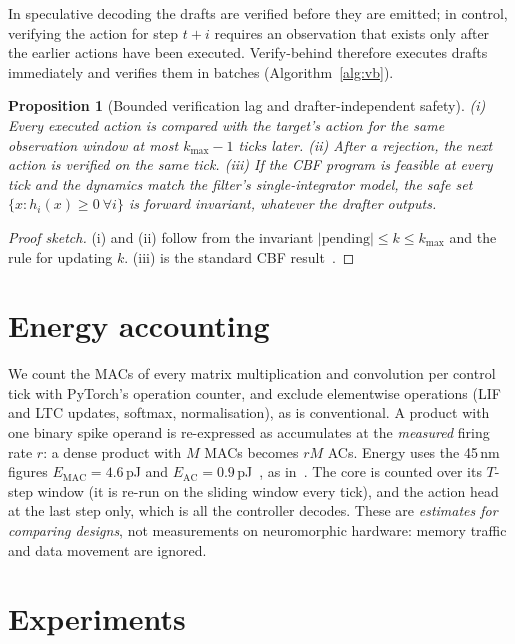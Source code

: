\documentclass[12pt]{article}
\newtheorem{proposition}{Proposition}
\begin{document}
In speculative decoding the drafts are verified before they are emitted; in control, verifying the action for step $t{+}i$ requires an observation that exists only after the earlier actions have been executed. Verify-behind therefore executes drafts immediately and verifies them in batches (Algorithm~\ref{alg:vb}).

\begin{proposition}[Bounded verification lag and drafter-independent safety]\label{prop:lag}
(i) Every executed action is compared with the target's action for the same observation window at most $k_{\max}-1$ ticks later. (ii) After a rejection, the next action is verified on the same tick. (iii) If the CBF program is feasible at every tick and the dynamics match the filter's single-integrator model, the safe set $\{x:h_i(x)\ge0\ \forall i\}$ is forward invariant, whatever the drafter outputs.
\end{proposition}
\begin{proof}[Proof sketch]
(i) and (ii) follow from the invariant $|\text{pending}|\le k\le k_{\max}$ and the rule for updating $k$. (iii) is the standard CBF result~\citep{ames2019cbf}.
\end{proof}

\section{Energy accounting}\label{sec:energy}
We count the MACs of every matrix multiplication and convolution per control tick with PyTorch's operation counter, and exclude elementwise operations (LIF and LTC updates, softmax, normalisation), as is conventional. A product with one binary spike operand is re-expressed as accumulates at the \emph{measured} firing rate $r$: a dense product with $M$ MACs becomes $rM$ ACs. Energy uses the 45\,nm figures $E_{\text{MAC}}=4.6$\,pJ and $E_{\text{AC}}=0.9$\,pJ~\citep{horowitz2014energy}, as in~\citep{zhou2023spikformer,yao2023spikedriven}. The core is counted over its $T$-step window (it is re-run on the sliding window every tick), and the action head at the last step only, which is all the controller decodes. These are \emph{estimates for comparing designs}, not measurements on neuromorphic hardware: memory traffic and data movement are ignored.

\section{Experiments}\label{sec:exp}
\end{document}
